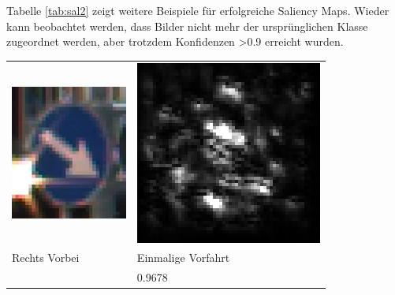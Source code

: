 Tabelle \ref{tab:sal2} zeigt weitere Beispiele für erfolgreiche Saliency Maps. Wieder kann beobachtet werden, dass Bilder nicht mehr der ursprünglichen Klasse zugeordnet werden, aber trotzdem Konfidenzen >0.9 erreicht wurden. 


\begin{table}
	\centering
	\begin{tabular}{p{4.4cm}p{4.4cm}}
		\includegraphics[height=4.4cm]{Images/AnPe/11240} &\includegraphics[width=\linewidth]{Images/AnPe/11240_guided}  \\
		Rechts Vorbei & Einmalige Vorfahrt\\
		& 0.9678\\

\end{tabular}
\end{table}
